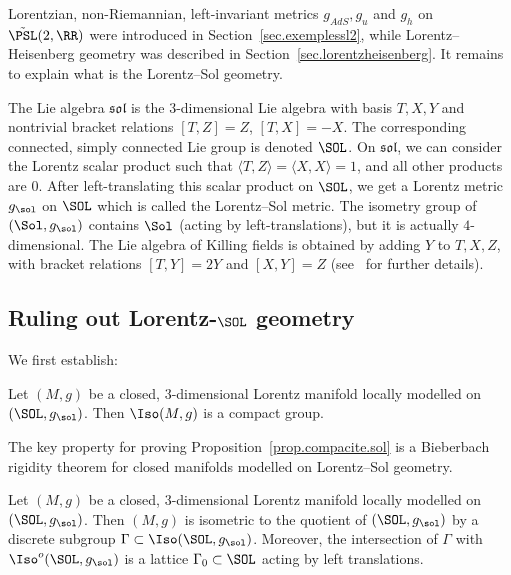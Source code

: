 Lorentzian, non-Riemannian, left-invariant metrics $g_{AdS},g_u$ and $g_h$ on $\tilde{\PSL}(2,\RR)$ were introduced in Section~\ref{sec.exemplessl2}, while Lorentz--Heisenberg geometry was described in Section~\ref{sec.lorentzheisenberg}. It remains to explain what is the Lorentz--Sol geometry.

The Lie algebra $\mathfrak{sol}$ is the $3$-dimensional Lie algebra with basis $T,X,Y$ and nontrivial bracket relations $[T,Z]=Z$, $[T,X]=-X$. The corresponding connected, simply connected Lie group is denoted $\SOL$. On $\mathfrak{sol}$, we can consider the Lorentz scalar product such that $\langle T,Z\rangle=\langle X,X\rangle=1$, and all other products are $0$. After left-translating this scalar product on $\SOL$, we get a Lorentz metric $g_{\sol}$ on $\SOL$ which is called the Lorentz--Sol metric. The isometry group of $(\Sol,g_{\sol})$ contains $\Sol$ (acting by left-translations), but it is actually $4$-dimensional. The Lie algebra of Killing fields is obtained by adding $Y$ to $T,X,Z$, with bracket relations $[T,Y]=2Y$ and $[X,Y]=Z$ (see~\cite[Section~4.2]{sorin.ghani} for further details).

\subsection{Ruling out Lorentz-\texorpdfstring{$\SOL$}{SOL} geometry}

We first establish:
\begin{prop}\label{prop.compacite.sol}
Let $(M,g)$ be a closed, $3$-dimensional Lorentz manifold locally modelled on $(\SOL,g_{\sol})$. Then $\Iso(M,g)$ is a compact group.
\end{prop}


The key property for proving Proposition~\ref{prop.compacite.sol} is a Bieberbach rigidity theorem for closed manifolds modelled on Lorentz--Sol geometry.

\begin{theo}\label{thm.bieberbach.sol}
Let $(M,g)$ be a closed, $3$-dimensional Lorentz manifold locally modelled on $(\SOL,g_{\sol})$. Then $(M,g)$ is isometric to the quotient of $(\SOL,g_{\sol})$ by a discrete subgroup $\Gamma \subset \Iso(\SOL,g_{\sol})$. Moreover, the intersection of $\Gamma$ with $\Iso^o(\SOL,g_{\sol})$ is a lattice $\Gamma_0 \subset \SOL$ acting by left translations.
\end{theo}



